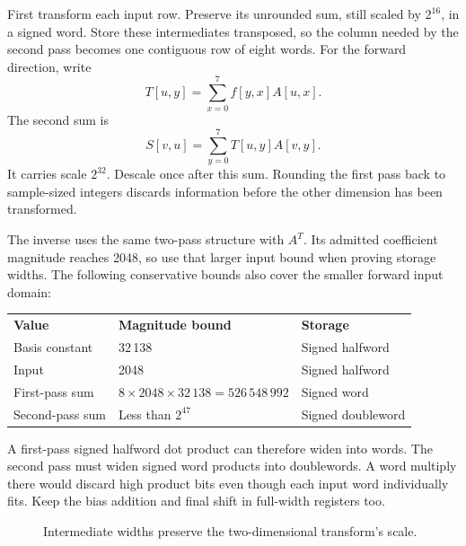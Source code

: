 First transform each input row. Preserve its unrounded sum, still scaled by
$2^{16}$, in a signed word. Store these intermediates transposed, so the column
needed by the second pass becomes one contiguous row of eight words. For the
forward direction, write
\[
 T[u,y]=\sum_{x=0}^{7}f[y,x]A[u,x].
\]
The second sum is
\[
 S[v,u]=\sum_{y=0}^{7}T[u,y]A[v,y].
\]
It carries scale $2^{32}$. Descale once after this sum. Rounding the first pass
back to sample-sized integers discards information before the other dimension
has been transformed.

The inverse uses the same two-pass structure with $A^T$. Its admitted coefficient
magnitude reaches 2048, so use that larger input bound when proving storage widths.
The following conservative bounds also cover the smaller forward input domain:
\begin{center}
\begin{tabular}{lll}
\textbf{Value} & \textbf{Magnitude bound} & \textbf{Storage}\\
Basis constant & 32\,138 & Signed halfword\\
Input & 2048 & Signed halfword\\
First-pass sum & $8\times2048\times32\,138=526\,548\,992$ & Signed word\\
Second-pass sum & Less than $2^{47}$ & Signed doubleword
\end{tabular}
\end{center}
A first-pass signed halfword dot product can therefore widen into words.
The second pass must widen signed word products into doublewords. A word multiply
there would discard high product bits even though each input word individually
fits. Keep the bias addition and final shift in full-width registers too.

\begin{figure}[htbp]
\centering
{}
\caption{Intermediate widths preserve the two-dimensional transform's scale.}
\end{figure}

